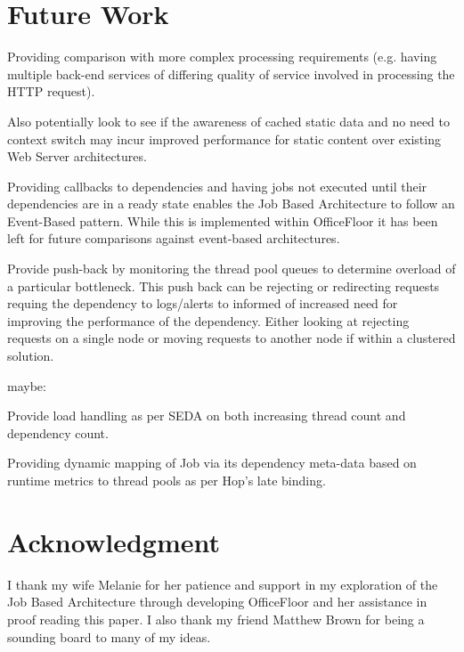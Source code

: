 \documentclass[conference]{ieee/IEEEtran}
\begin{document}
\section{Future Work}
Providing comparison with more complex processing requirements (e.g. having
multiple back-end services of differing quality of service involved in
processing the HTTP request).

Also potentially look to see if the awareness of cached static data and no need
to context switch may incur improved performance for static content over
existing Web Server architectures.

Providing callbacks to dependencies and having jobs not executed until their
dependencies are in a ready state enables the Job Based Architecture to follow
an Event-Based pattern.  While this is implemented within OfficeFloor it has
been left for future comparisons against event-based architectures.

Provide push-back by monitoring the thread pool queues to determine overload of
a particular bottleneck.  This push back can be rejecting or redirecting
requests requing the dependency to logs/alerts to informed of increased need
for improving the performance of the dependency.  Either looking at rejecting
requests on a single node or moving requests to another node if within a
clustered solution.

maybe:

Provide load handling as per SEDA on both increasing thread count and
dependency count.

Providing dynamic mapping of Job via its dependency meta-data based on runtime
metrics to thread pools as per Hop's late binding.






\section*{Acknowledgment}
I thank my wife Melanie for her patience and support in my exploration of the
Job Based Architecture through developing OfficeFloor and her assistance in
proof reading this paper.  I also thank my friend Matthew Brown for being a
sounding board to many of my ideas.











\end{document}
